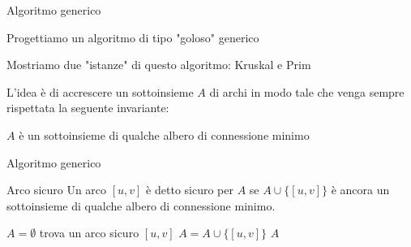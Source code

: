 \begin{frame}{Algoritmo generico}

\BI
\item Progettiamo un algoritmo di tipo "goloso" generico
\item Mostriamo due "istanze" di questo algoritmo: \alert{Kruskal} e \alert{Prim}
\EI

\medskip
{}
L'idea è di accrescere un sottoinsieme $A$ di archi in modo tale che venga sempre
rispettata la seguente invariante:
\BI
\item $A$ è un sottoinsieme di qualche albero di connessione minimo
\EI

\end{frame}

\begin{frame}{Algoritmo generico}

\begin{block}{Arco sicuro}
Un arco $[u,v]$ è detto \alert{sicuro per $A$} se $A \cup \{[u,v]\}$ è ancora un sottoinsieme di qualche albero di connessione minimo.
\end{block}

\medskip
\begin{Procedure}
\caption[A]{\Set\ (\Graph $G$, $\INTEGER[\,]\ w$)}

  \Set $A = \emptyset$\;
  {
     trova un arco sicuro $[u,v]$\;
     $A = A \cup \{[u,v]\}$\;
  } 
  \Return $A$\;  

\end{Procedure}

\end{frame}

